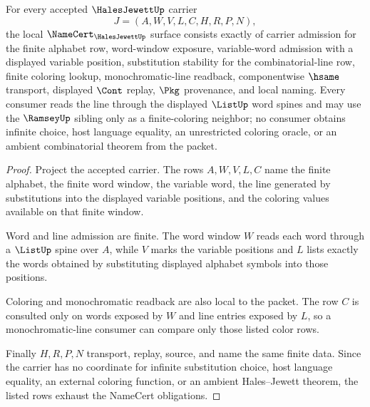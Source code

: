 \begin{theorem}
\label{thm:hales-jewett-namecert-obligations}
For every accepted $\HalesJewettUp$ carrier
$$
J=(A,W,V,L,C,H,R,P,N),
$$
the local $\NameCert_{\HalesJewettUp}$ surface consists exactly of carrier admission for the finite alphabet row, word-window exposure, variable-word admission with a displayed variable position, substitution stability for the combinatorial-line row, finite coloring lookup, monochromatic-line readback, componentwise $\hsame$ transport, displayed $\Cont$ replay, $\Pkg$ provenance, and local naming. Every consumer reads the line through the displayed $\ListUp$ word spines and may use the $\RamseyUp$ sibling only as a finite-coloring neighbor; no consumer obtains infinite choice, host language equality, an unrestricted coloring oracle, or an ambient combinatorial theorem from the packet.
\end{theorem}
\begin{proof}
Project the accepted carrier. The rows $A,W,V,L,C$ name the finite alphabet, the finite word window, the variable word, the line generated by substitutions into the displayed variable positions, and the coloring values available on that finite window.

Word and line admission are finite. The word window $W$ reads each word through a $\ListUp$ spine over $A$, while $V$ marks the variable positions and $L$ lists exactly the words obtained by substituting displayed alphabet symbols into those positions.

Coloring and monochromatic readback are also local to the packet. The row $C$ is consulted only on words exposed by $W$ and line entries exposed by $L$, so a monochromatic-line consumer can compare only those listed color rows.

Finally $H,R,P,N$ transport, replay, source, and name the same finite data. Since the carrier has no coordinate for infinite substitution choice, host language equality, an external coloring function, or an ambient Hales--Jewett theorem, the listed rows exhaust the NameCert obligations.
\end{proof}

